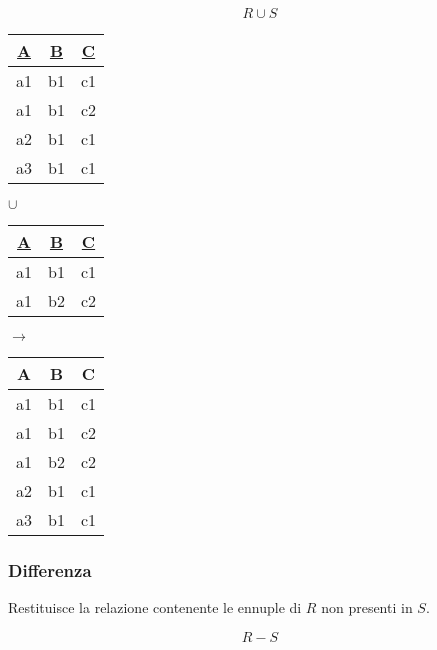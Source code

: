 \begin{equation}
	R \cup S
\end{equation}

\begin{table}[!h]
	\centering
	\begin{tabular}{|c|c|c|}
		\hline
		\textbf{\underline{A}} & \textbf{\underline{B}} & \textbf{\underline{C}} \\
		\hline
		a1 & b1 & c1 \\
		\hline
		a1 & b1 & c2 \\
		\hline
		a2 & b1 & c1 \\
		\hline
		a3 & b1 & c1 \\
		\hline
	\end{tabular}
	\hspace{10pt} $\cup$ \hspace{10pt}
	\begin{tabular}{|c|c|c|}
		\hline
		\textbf{\underline{A}} & \textbf{\underline{B}} & \textbf{\underline{C}} \\
		\hline
		a1 & b1 & c1 \\
		\hline
		a1 & b2 & c2 \\
		\hline
	\end{tabular}
	\hspace{10pt} $\longrightarrow$ \hspace{10pt}
	\begin{tabular}{|c|c|c|}
		\hline
		\textbf{A} & \textbf{B} & \textbf{C} \\
		\hline
		a1 & b1 & c1 \\
		\hline
		a1 & b1 & c2 \\
		\hline
		a1 & b2 & c2 \\
		\hline
		a2 & b1 & c1 \\
		\hline
		a3 & b1 & c1 \\
		\hline
	\end{tabular}
\end{table}
\subsubsection{Differenza}
Restituisce la relazione contenente le ennuple di $R$ non presenti in $S$.

\begin{equation}
	R-S
\end{equation}


